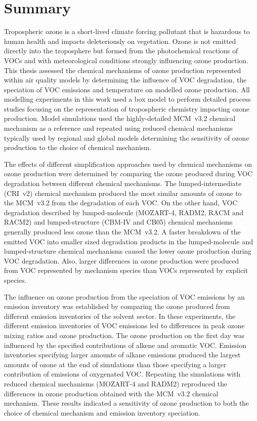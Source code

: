 \section{Summary}
Tropospheric ozone is a short-lived climate forcing pollutant that is hazardous to human health and impacts deleteriously on vegetation.
Ozone is not emitted directly into the troposphere but formed from the photochemical reactions of VOCs and  with meteorological conditions strongly influencing ozone production.
This thesis assessed the chemical mechanisms of ozone production represented within air quality models by determining the influence of VOC degradation, the speciation of VOC emissions and temperature on modelled ozone production.
All modelling experiments in this work used a box model to perform detailed process studies focusing on the representation of tropospheric chemistry impacting ozone production.
Model simulations used the highly-detailed MCM~v3.2 chemical mechanism as a reference and repeated using reduced chemical mechanisms typically used by regional and global models determining the sensitivity of ozone production to the choice of chemical mechanism.

The effects of different simplification approaches used by chemical mechanisms on ozone production were determined by comparing the ozone produced during VOC degradation between different chemical mechanisms.
The lumped-intermediate (CRI~v2) chemical mechanism produced the most similar amounts of ozone to the MCM~v3.2 from the degradation of each VOC.
On the other hand, VOC degradation described by lumped-molecule (MOZART-4, RADM2, RACM and RACM2) and lumped-structure (CBM-IV and CB05) chemical mechanisms generally produced less ozone than the MCM~v3.2.
A faster breakdown of the emitted VOC into smaller sized degradation products in the lumped-molecule and lumped-structure chemical mechanisms caused the lower ozone production during VOC degradation.
Also, larger differences in ozone production were produced from VOC represented by mechanism species than VOCs represented by explicit species.

The influence on ozone production from the speciation of VOC emissions by an emission inventory was established by comparing the ozone produced from different emission inventories of the solvent sector.
In these experiments, the different emission inventories of VOC emissions led to differences in peak ozone mixing ratios and ozone production.
The ozone production on the first day was influenced by the specified contributions of alkene and aromatic VOC.
Emission inventories specifying larger amounts of alkane emissions produced the largest amounts of ozone at the end of simulations than those specifying a larger contribution of emissions of oxygenated VOC.
Repeating the simulations with reduced chemical mechanisms (MOZART-4 and RADM2) reproduced the differences in ozone production obtained with the MCM~v3.2 chemical mechanism.
These results indicated a sensitivity of ozone production to both the choice of chemical mechanism and emission inventory speciation.

